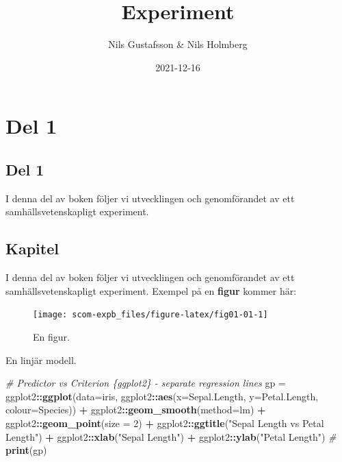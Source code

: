 \documentclass[
]{book}
\title{Experiment}
\author{Nils Gustafsson \& Nils Holmberg}
\date{2021-12-16}
\newenvironment{Shaded}{\begin{snugshade}}{\end{snugshade}}
\newcommand{\CommentTok}[1]{\textcolor[rgb]{0.56,0.35,0.01}{\textit{#1}}}
\newcommand{\DataTypeTok}[1]{\textcolor[rgb]{0.13,0.29,0.53}{#1}}
\newcommand{\DecValTok}[1]{\textcolor[rgb]{0.00,0.00,0.81}{#1}}
\newcommand{\KeywordTok}[1]{\textcolor[rgb]{0.13,0.29,0.53}{\textbf{#1}}}
\newcommand{\NormalTok}[1]{#1}
\newcommand{\OperatorTok}[1]{\textcolor[rgb]{0.81,0.36,0.00}{\textbf{#1}}}
\newcommand{\StringTok}[1]{\textcolor[rgb]{0.31,0.60,0.02}{#1}}
\begin{document}
\maketitle

{
\setcounter{tocdepth}{1}
\tableofcontents
}
\hypertarget{part-del-1}{%
\part{Del 1}\label{part-del-1}}

\hypertarget{del-1}{%
\chapter*{Del 1}\label{del-1}}

I denna del av boken följer vi utvecklingen och genomförandet av ett samhällsvetenskapligt experiment.

\hypertarget{chap01}{%
\chapter{Kapitel}\label{chap01}}

I denna del av boken följer vi utvecklingen och genomförandet av ett samhällsvetenskapligt experiment. Exempel på en \textbf{figur} kommer här:

\begin{figure}

{\centering \texttt{[image: scom-expb\_files/figure-latex/fig01-01-1]} 

}

\caption{En figur.}\label{fig:fig01-01}
\end{figure}

En linjär modell.

\begin{Shaded}
\begin{Highlighting}[]
\CommentTok{\# Predictor vs Criterion \{ggplot2\} {-} separate regression lines}
\NormalTok{gp =}\StringTok{ }\NormalTok{ggplot2}\OperatorTok{::}\KeywordTok{ggplot}\NormalTok{(}\DataTypeTok{data=}\NormalTok{iris, }
\NormalTok{ggplot2}\OperatorTok{::}\KeywordTok{aes}\NormalTok{(}\DataTypeTok{x=}\NormalTok{Sepal.Length,}
\DataTypeTok{y=}\NormalTok{Petal.Length,}
\DataTypeTok{colour=}\NormalTok{Species)) }\OperatorTok{+}\StringTok{ }
\NormalTok{ggplot2}\OperatorTok{::}\KeywordTok{geom\_smooth}\NormalTok{(}\DataTypeTok{method=}\NormalTok{lm) }\OperatorTok{+}\StringTok{ }
\NormalTok{ggplot2}\OperatorTok{::}\KeywordTok{geom\_point}\NormalTok{(}\DataTypeTok{size =} \DecValTok{2}\NormalTok{) }\OperatorTok{+}
\NormalTok{ggplot2}\OperatorTok{::}\KeywordTok{ggtitle}\NormalTok{(}\StringTok{"Sepal Length vs Petal Length"}\NormalTok{) }\OperatorTok{+}
\NormalTok{ggplot2}\OperatorTok{::}\KeywordTok{xlab}\NormalTok{(}\StringTok{"Sepal Length"}\NormalTok{) }\OperatorTok{+}\StringTok{ }\NormalTok{ggplot2}\OperatorTok{::}\KeywordTok{ylab}\NormalTok{(}\StringTok{"Petal Length"}\NormalTok{)}
\CommentTok{\#}
\KeywordTok{print}\NormalTok{(gp)}
\end{Highlighting}
\end{Shaded}
\end{document}
